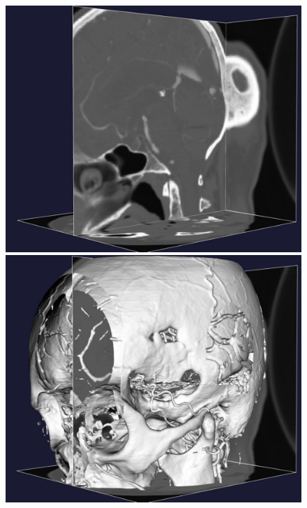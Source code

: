 \begin{figure}
          {\includegraphics[width=\threefigsfull]{chapters/kvs-2/pdf/stacks.pdf}
            \includegraphics[width=\threefigsfull]{chapters/kvs-2/pdf/3d.pdf}
}
\end{figure}
